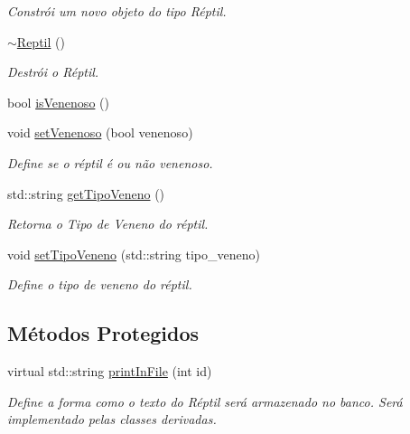 \begin{DoxyCompactItemize}
\begin{DoxyCompactList}\small\item\em Constrói um novo objeto do tipo Réptil. \end{DoxyCompactList}\item 
\mbox{\label{classReptil_a826ed679cc45f74fefecef7d4d40b409}} 
\hyperlink{classReptil_a826ed679cc45f74fefecef7d4d40b409}{$\sim$\+Reptil} ()
\begin{DoxyCompactList}\small\item\em Destrói o Réptil. \end{DoxyCompactList}\item 
bool \hyperlink{classReptil_a07867a1252f279a1fd5afb576d0a5c9a}{is\+Venenoso} ()
\item 
void \hyperlink{classReptil_a9f7ab2a0e2b30040c7c9df48039a266a}{set\+Venenoso} (bool venenoso)
\begin{DoxyCompactList}\small\item\em Define se o réptil é ou não venenoso. \end{DoxyCompactList}\item 
std\+::string \hyperlink{classReptil_aa5e4cd3fa2d94916a3ba5cc20299d3cf}{get\+Tipo\+Veneno} ()
\begin{DoxyCompactList}\small\item\em Retorna o Tipo de Veneno do réptil. \end{DoxyCompactList}\item 
void \hyperlink{classReptil_a3a91e206459f45bf2f951e914b3bc195}{set\+Tipo\+Veneno} (std\+::string tipo\+\_\+veneno)
\begin{DoxyCompactList}\small\item\em Define o tipo de veneno do réptil. \end{DoxyCompactList}\end{DoxyCompactItemize}
\subsection*{Métodos Protegidos}
\begin{DoxyCompactItemize}
\item 
virtual std\+::string \hyperlink{classReptil_af0fc1ff345f15480da9830e38111d181}{print\+In\+File} (int id)
\begin{DoxyCompactList}\small\item\em Define a forma como o texto do Réptil será armazenado no banco. Será implementado pelas classes derivadas. \end{DoxyCompactList}\end{DoxyCompactItemize}
